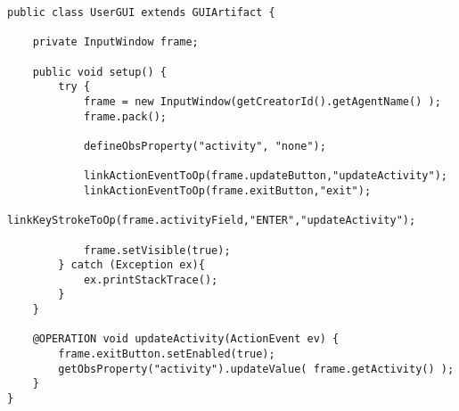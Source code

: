 \documentclass[12pt,A4]{article}
\begin{document}
\begin{verbatim}
public class UserGUI extends GUIArtifact {

	private InputWindow frame;

	public void setup() {
		try {
			frame = new InputWindow(getCreatorId().getAgentName() );
			frame.pack();

			defineObsProperty("activity", "none");

			linkActionEventToOp(frame.updateButton,"updateActivity");
			linkActionEventToOp(frame.exitButton,"exit");
			linkKeyStrokeToOp(frame.activityField,"ENTER","updateActivity");

			frame.setVisible(true);
		} catch (Exception ex){
			ex.printStackTrace();
		}
	}

	@OPERATION void updateActivity(ActionEvent ev) {
		frame.exitButton.setEnabled(true);
		getObsProperty("activity").updateValue( frame.getActivity() );
	}
}
\end{verbatim}
\end{document}
